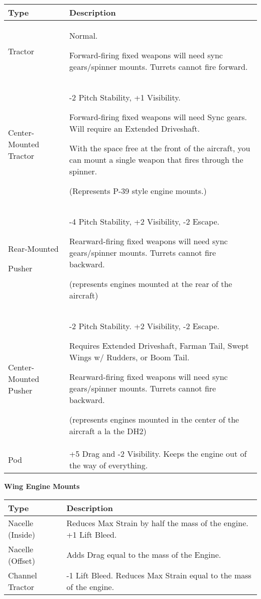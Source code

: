 \documentclass{article}
\begin{document}
\begin{tabular}{|l|l|}
  \hline
  Type                   & Description                                                   \\\hline
  Tractor                & Normal.

  Forward-firing fixed weapons will need sync gears/spinner mounts.
  Turrets cannot fire forward.                                                           \\\hline
  Center-Mounted Tractor & -2 Pitch Stability, +1 Visibility.

  Forward-firing fixed weapons will need Sync gears. Will require an
  Extended Driveshaft.

  With the space free at the front of the aircraft, you can mount a single
  weapon that fires through the spinner.

  (Represents P-39 style engine mounts.)                                                 \\\hline
  Rear-Mounted

  Pusher                 & -4 Pitch Stability, +2 Visibility, -2 Escape.

  Rearward-firing fixed weapons will need sync gears/spinner mounts.
  Turrets cannot fire backward.

  (represents engines mounted at the rear of the aircraft)                               \\\hline
  Center-Mounted Pusher  & -2 Pitch Stability. +2 Visibility, -2 Escape.

  Requires Extended Driveshaft, Farman Tail, Swept Wings w/ Rudders, or
  Boom Tail.

  Rearward-firing fixed weapons will need sync gears/spinner mounts.
  Turrets cannot fire backward.

  (represents engines mounted in the center of the aircraft a la the
  DH2)                                                                                   \\\hline
  Pod                    & +5 Drag and -2 Visibility. Keeps the engine out of the way of
  everything.                                                                            \\\hline
\end{tabular}

\textbf{Wing Engine Mounts}

\begin{tabular}{|l|l|}
  \hline
  Type             & Description                                            \\\hline
  Nacelle (Inside) & Reduces Max Strain by half the mass of the engine. +1
  Lift Bleed.                                                               \\\hline
  Nacelle (Offset) & Adds Drag equal to the mass of the Engine.             \\\hline
  Channel Tractor  & -1 Lift Bleed. Reduces Max Strain equal to the mass of
  the engine.                                                               \\\hline
\end{tabular}
\end{document}
